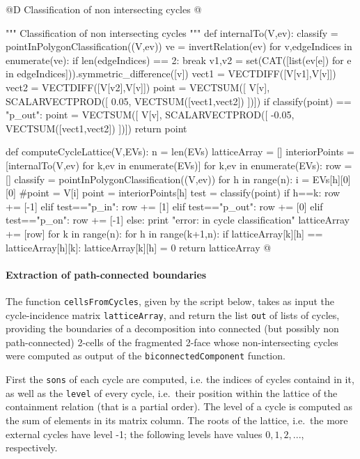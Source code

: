 \documentclass[11pt,oneside]{article}	%
\begin{document}
@D Classification of non intersecting cycles
@{""" Classification of non intersecting cycles """
def internalTo(V,ev):
    classify = pointInPolygonClassification((V,ev))
    ve = invertRelation(ev)
    for v,edgeIndices in enumerate(ve):
        if len(edgeIndices) == 2: break
    v1,v2 = set(CAT([list(ev[e]) for e in edgeIndices])).symmetric_difference([v])
    vect1 = VECTDIFF([V[v1],V[v]])
    vect2 = VECTDIFF([V[v2],V[v]])
    point = VECTSUM([ V[v], SCALARVECTPROD([ 0.05, VECTSUM([vect1,vect2]) ])])
    if classify(point) == "p_out":
        point = VECTSUM([ V[v], SCALARVECTPROD([ -0.05, VECTSUM([vect1,vect2]) ])])
    return point
    
def computeCycleLattice(V,EVs):
    n = len(EVs)
    latticeArray = []
    interiorPoints = [internalTo(V,ev) for k,ev in enumerate(EVs)]
    for k,ev in enumerate(EVs):
        row = []
        classify = pointInPolygonClassification((V,ev))
        for h in range(n):
            i = EVs[h][0][0]
            #point = V[i]
            point = interiorPoints[h]
            test = classify(point)
            if h==k: row += [-1]
            elif test=="p_in": row += [1]
            elif test=="p_out": row += [0]
            elif test=="p_on": row += [-1]
            else: print "error: in cycle classification"
        latticeArray += [row]
    for k in range(n):
        for h in range(k+1,n): 
            if latticeArray[k][h] == latticeArray[h][k]:
                latticeArray[k][h] = 0
    return latticeArray
@}

\paragraph{Extraction of path-connected boundaries}

The function \texttt{cellsFromCycles}, given by the script below, takes as input the cycle-incidence matrix \texttt{latticeArray}, and return the list \texttt{out} of lists of cycles, providing the boundaries of a decomposition into connected (but possibly non path-connected) 2-cells of the fragmented 2-face whose non-intersecting cycles were computed as output of the \texttt{biconnectedComponent} function. 

First the \texttt{sons} of each cycle are computed, i.e. the indices of cycles containd in it, as well as the \texttt{level} of every cycle, i.e.~their position within the lattice of the containment relation (that is a partial order). 
The level of a cycle is computed as the sum of elements in its matrix column. The roots of the lattice, i.e.~the more external cycles have level -1; the following levels have values $0,1,2,...$, respectively.
\end{document}

